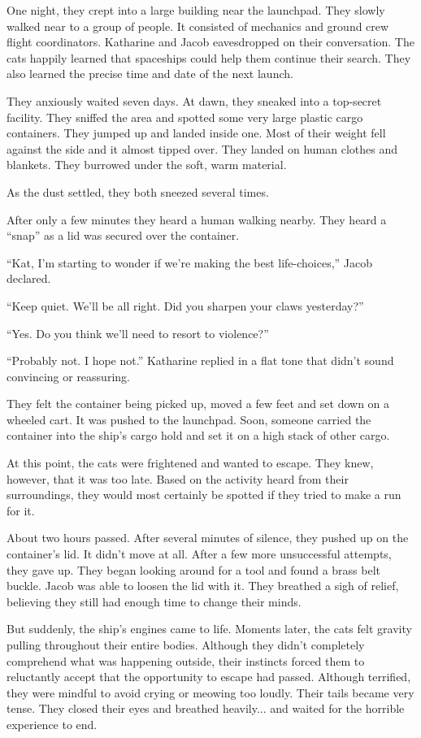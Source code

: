 One night, they crept into a large building near the launchpad. They slowly walked near to a group of people. It consisted of mechanics and ground crew flight coordinators. Katharine and Jacob eavesdropped on their conversation. The cats happily learned that spaceships could help them continue their search. They also learned the precise time and date of the next launch.

They anxiously waited seven days. At dawn, they sneaked into a top-secret facility. They sniffed the area and spotted some very large plastic cargo containers. They jumped up and landed inside one. Most of their weight fell against the side and it almost tipped over. They landed on human clothes and blankets. They burrowed under the soft, warm material.

As the dust settled, they both sneezed several times.

After only a few minutes they heard a human walking nearby. They heard a “snap” as a lid was secured over the container.

“Kat, I'm starting to wonder if we're making the best life-choices,” Jacob declared.

“Keep quiet. We'll be all right. Did you sharpen your claws yesterday?”

“Yes. Do you think we'll need to resort to violence?”

“Probably not. I hope not.” Katharine replied in a flat tone that didn't sound convincing or reassuring.

They felt the container being picked up, moved a few feet and set down on a wheeled cart. It was pushed to the launchpad. Soon, someone carried the container into the ship's cargo hold and set it on a high stack of other cargo.

At this point, the cats were frightened and wanted to escape. They knew, however, that it was too late. Based on the activity heard from their surroundings, they would most certainly be spotted if they tried to make a run for it.

About two hours passed. After several minutes of silence, they pushed up on the container's lid. It didn't move at all. After a few more unsuccessful attempts, they gave up. They began looking around for a tool and found a brass belt buckle. Jacob was able to loosen the lid with it. They breathed a sigh of relief, believing they still had enough time to change their minds.

But suddenly, the ship's engines came to life. Moments later, the cats felt gravity pulling throughout their entire bodies. Although they didn't completely comprehend what was happening outside, their instincts forced them to reluctantly accept that the opportunity to escape had passed. Although terrified, they were mindful to avoid crying or meowing too loudly. Their tails became very tense. They closed their eyes and breathed heavily... and waited for the horrible experience to end.

